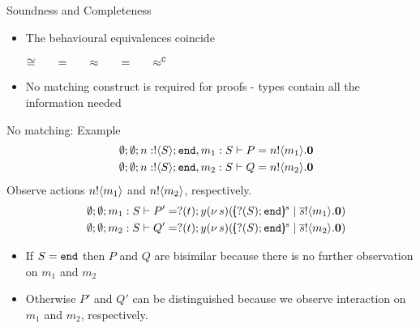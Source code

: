 \documentclass{beamer}
\begin{document}
	\begin{frame}{Soundness and Completeness}
		\begin{itemize}
			\item	The behavioural equivalences coincide

				\begin{theorem}
					\begin{center}
					$\cong \qquad =\qquad \approx \qquad =\qquad \approx^\mathtt{C}$
					\end{center}
				\end{theorem}

			\item	No matching construct is required for proofs - types contain all the information needed

		\end{itemize}
	\end{frame}

	\begin{frame}{No matching: Example}
			\begin{eqnarray*}
				&&\emptyset; \emptyset; n: ! \langle S \rangle ; \mathtt{end}, m_1 : S \vdash P = n ! \langle m_1 \rangle . \mathbf{0} \\
				&&\emptyset; \emptyset; n: ! \langle S \rangle ; \mathtt{end}, m_2 : S \vdash Q = n ! \langle m_2 \rangle . \mathbf{0}
			\end{eqnarray*}
			Observe actions $n ! \langle m_1 \rangle$ and $n ! \langle m_2 \rangle$, respectively.
			\begin{eqnarray*}
				&&\es; \es; m_1 : S \proves P' = \btinp{t}{y} \newsp{s}{\mapchar{\btinp{S} \tinact}{s}\Par \bout{\dual{s}}{m_1}\inact} \\
				&&\es; \es; m_2 : S \proves Q' = \btinp{t}{y} \newsp{s}{\mapchar{\btinp{S} \tinact}{s}\Par \bout{\dual{s}}{m_2}\inact} 
			\end{eqnarray*}

			\begin{itemize}
				\item	If $S = \mathtt{end}$ then $P$ and $Q$ are bisimilar because there is no further observation on $m_1$ and $m_2$
				\item	Otherwise $P'$ and $Q'$ can be distinguished because we observe interaction on $m_1$ and $m_2$,
					respectively.
			\end{itemize}
	\end{frame}
\end{document}
